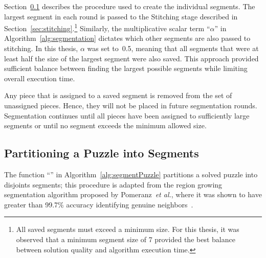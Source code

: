 Section~\ref{sec:segmentPuzzle} describes the procedure used to create the individual segments. The largest segment in each round is passed to the Stitching stage described in Section~\ref{sec:stitching}.\footnote{All saved segments must exceed a minimum size.  For this thesis, it was observed that a minimum segment size of 7 provided the best balance between solution quality and algorithm execution time.} Similarly, the multiplicative scalar term ``\textit{$\alpha$}'' in Algorithm~\ref{alg:segmentation} dictates which other segments are also passed to stitching.  In this thesis, \textit{$\alpha$} was set to~0.5, meaning that all segments that were at least half the size of the largest segment were also saved.  This approach provided sufficient balance between finding the largest possible segments while limiting overall execution time.

Any piece that is assigned to a saved segment is removed from the set of unassigned pieces.  Hence, they will not be placed in future segmentation rounds.  Segmentation continues until all pieces have been assigned to sufficiently large segments or until no segment exceeds the minimum allowed size.

\subsection{Partitioning a Puzzle into Segments}\label{sec:segmentPuzzle}

The function ``'' in Algorithm~\ref{alg:segmentPuzzle} partitions a solved puzzle into disjoints segments; this procedure is adapted from the region growing segmentation algorithm proposed by Pomeranz~\textit{et al.}, where it was shown to have greater than 99.7\% accuracy identifying genuine neighbors~\cite{pomeranz2011}. 

